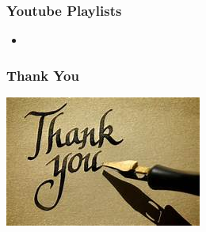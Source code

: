 \documentclass[12pt]{beamer}
\begin{document}
\begin {frame}
    \frametitle {Youtube Playlists}
    \begin {itemize}          
        \item {}
             
    \end {itemize}       
\end {frame}

\begin{frame}  
  \frametitle{Thank You}      
      \begin {center}
         \includegraphics[scale=1.6]{TQ.jpg} 
      \end{center} 
\end{frame}  
\end{document}
